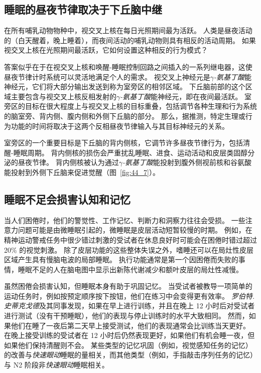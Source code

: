 \subsection{睡眠的昼夜节律取决于下丘脑中继}

在所有哺乳动物物种中，视交叉上核在每日光照期间最为活跃。
人类是昼夜活动的（白天醒着，晚上睡着），而夜间活动的哺乳动物则具有相反的活动周期。
如果视交叉上核在光照期间最活跃，它如何设置这种相反的行为模式？


答案似乎在于在视交叉上核和唤醒-睡眠控制回路之间插入的一系列继电器，这使昼夜节律计时系统可以灵活地满足个人的需求。
视交叉上神经元是\textit{$\gamma$-氨基丁酸}能神经元，它们将大部分输出发送到称为室旁区的相邻区域。
下丘脑前部的这个区域主要包含与视交叉上核反相发射的\textit{$\gamma$-氨基丁酸}能神经元，即在夜间最活跃。
室旁区的目标在很大程度上与视交叉上核的目标重叠，包括调节各种生理和行为系统的脑室旁、背内侧、腹内侧和外侧下丘脑的部分。
那么，据推测，特定生理或行为功能的时间将取决于这两个反相昼夜节律输入与其目标神经元的关系。


室旁区的一个重要目标是下丘脑的背内侧核，它调节许多昼夜节律行为，包括清醒-睡眠周期。
背内侧核的损伤会严重扰乱睡眠、进食、运动活动和皮层类固醇分泌的昼夜节律。
背内侧核被认为通过\textit{$\gamma$-氨基丁酸}能投射到腹外侧视前核和谷氨酸能投射到外侧下丘脑来促进觉醒（图~\ref{fig:44_7}）。



\subsection{睡眠不足会损害认知和记忆}

当人们困倦时，他们的警觉性、工作记忆、判断力和洞察力往往会受损。
一些注意力问题可能是由微睡眠引起的，微睡眠是皮层活动短暂较慢的时期。
例如，在精神运动警戒任务中很少错过刺激的受试者在休息良好时可能会在困倦时错过超过 20\% 的视觉刺激。
除了皮层功能的这些整体失误之外，嗜睡还可以在局灶性皮层区域产生具有慢脑电波的局部睡眠。
执行功能通常是第一个因困倦而失败的事情，睡眠不足的人在脑电图中显示出新陈代谢减少和额叶皮层的局灶性减慢。


虽然困倦会损害认知，但睡眠本身有助于巩固记忆。
当受试者被教导一项简单的运动任务时，例如按预定顺序按下按钮，他们在练习中会变得更有效率。
\textit{罗伯特.史蒂克戈德}及其同事发现，如果在早上进行训练，并且在晚上 12 小时后对受试者进行测试（没有干预睡眠），他们的表现与停止训练时的水平大致相同。
然而，如果他们在睡了一夜后第二天早上接受测试，他们的表现通常会比训练当天更好。
在晚上接受训练的受试者在 12 小时后仍然表现更好，如果他们有机会睡一夜，但如果他们保持清醒则不会。
某些类型的记忆巩固（例如，视觉感知任务的记忆）的改善与\textit{快速眼动}睡眠的量相关，而其他类型（例如，手指敲击序列任务的记忆）与 N2 阶段非\textit{快速眼动}睡眠相关。


